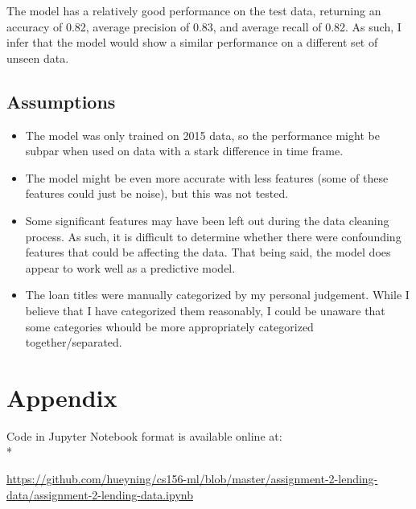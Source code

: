 \documentclass[11pt]{article}
\providecommand{\tightlist}{%
      \setlength{\itemsep}{0pt}\setlength{\parskip}{0pt}}
\def\br{\hspace*{\fill} \\* }
\begin{document}
The model has a relatively good performance on the test data, returning
an accuracy of 0.82, average precision of 0.83, and average recall of
0.82. As such, I infer that the model would show a similar performance
on a different set of unseen data.

    \subsection{Assumptions}

\begin{itemize}
\tightlist
\item
  The model was only trained on 2015 data, so the performance might be
  subpar when used on data with a stark difference in time frame.
\item
  The model might be even more accurate with less features (some of
  these features could just be noise), but this was not tested.
\item
  Some significant features may have been left out during the data
  cleaning process. As such, it is difficult to determine whether there
  were confounding features that could be affecting the data. That being
  said, the model does appear to work well as a predictive model.
\item
  The loan titles were manually categorized by my personal judgement.
  While I believe that I have categorized them reasonably, I could be
  unaware that some categories whould be more appropriately categorized
  together/separated.
\end{itemize}
\newpage
\section{Appendix}
Code in Jupyter Notebook format is available online at: \br

\url{https://github.com/hueyning/cs156-ml/blob/master/assignment-2-lending-data/assignment-2-lending-data.ipynb}


    
    
    
    
\end{document}
